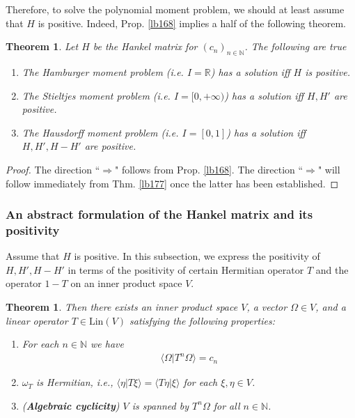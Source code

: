 \documentclass[12pt,b5paper,notitlepage]{article}
\theoremstyle{definition}
\theoremstyle{plain}
\newtheorem{thm}[df]{Theorem}
\newcommand{\bk}[1]{\langle {#1}\rangle}
\newcommand{\Nbb}{\mathbb N}
\newcommand{\Rbb}{\mathbb R}
\newcommand{\Lin}{\mathrm{Lin}}
\numberwithin{equation}{section}
\begin{document}
Therefore, to solve the polynomial moment problem, we should at least assume that $H$ is positive. Indeed, Prop. \ref{lb168} implies a half of the following theorem.
\begin{thm}\label{lb169}
Let $H$ be the Hankel matrix for $(c_n)_{n\in\Nbb}$. The following are true
\begin{enumerate}
\item The Hamburger moment problem (i.e. $I=\Rbb$) has a solution iff $H$ is positive.
\item The Stieltjes moment problem (i.e. $I=[0,+\infty)$) has a solution iff $H,H'$ are positive.
\item The Hausdorff moment problem (i.e. $I=[0,1]$) has a solution iff $H,H',H-H'$ are positive.
\end{enumerate}
\end{thm}


\begin{proof}
The direction ``$\Rightarrow$" follows from Prop. \ref{lb168}. The direction ``$\Rightarrow$" will follow immediately from Thm. \ref{lb177} once the latter has been established.
\end{proof}



\subsubsection{An abstract formulation of the Hankel matrix and its positivity}

Assume that $H$ is positive. In this subsection, we express the positivity of $H,H',H-H'$ in terms of the positivity of certain Hermitian operator $T$ and the operator $1-T$ on an inner product space $V$.

\begin{thm}\label{lb167}
Then there exists an inner product space $V$, a vector $\Omega\in V$, and a linear operator $T\in\Lin(V)$ satisfying the following properties:
\begin{enumerate}[label=(\arabic*)]
\item For each $n\in\Nbb$ we have
\begin{align}\label{eq85}
\bk{\Omega|T^n\Omega}=c_n
\end{align}
\item $\omega_T$ is Hermitian, i.e., $\bk{\eta|T\xi}=\bk{T\eta|\xi}$ for each $\xi,\eta\in V$.
\item (\textbf{Algebraic cyclicity}) $V$ is spanned by $T^n\Omega$ for all $n\in\Nbb$.
\end{enumerate}
\end{thm}
\end{document}

